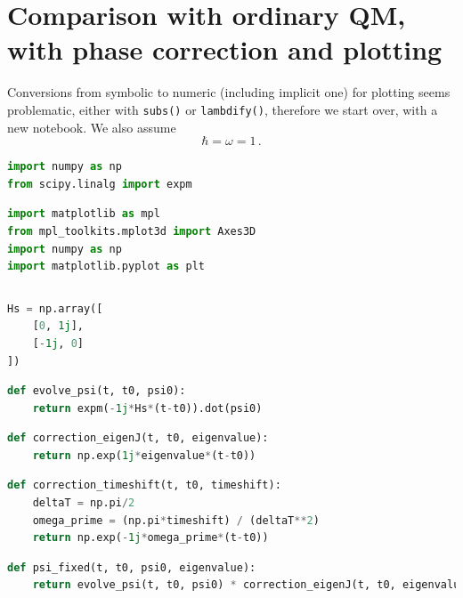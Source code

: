 \hypertarget{nb:moreva-vs-qm}{%
\section{Comparison with ordinary
QM, with phase correction and plotting}\label{nb:moreva-vs-qm}}

Conversions from symbolic to numeric (including implicit one) for
plotting seems problematic, either with \verb#subs()#
or \verb#lambdify()#, therefore we start over, with a
new notebook. We also assume \begin{equation*}
    \hbar = \omega = 1 \,\text{.}
\end{equation*}

\begin{lstlisting}[language=Python]
import numpy as np
from scipy.linalg import expm
\end{lstlisting}

\begin{lstlisting}[language=Python]
import matplotlib as mpl
from mpl_toolkits.mplot3d import Axes3D
import numpy as np
import matplotlib.pyplot as plt
\end{lstlisting}

\begin{lstlisting}[language=Python]
%matplotlib inline
\end{lstlisting}

\begin{lstlisting}[language=Python]
Hs = np.array([
    [0, 1j],
    [-1j, 0]
])
\end{lstlisting}

\begin{lstlisting}[language=Python]
def evolve_psi(t, t0, psi0):
    return expm(-1j*Hs*(t-t0)).dot(psi0)
\end{lstlisting}

\begin{lstlisting}[language=Python]
def correction_eigenJ(t, t0, eigenvalue):
    return np.exp(1j*eigenvalue*(t-t0))
\end{lstlisting}

\begin{lstlisting}[language=Python]
def correction_timeshift(t, t0, timeshift):
    deltaT = np.pi/2
    omega_prime = (np.pi*timeshift) / (deltaT**2)
    return np.exp(-1j*omega_prime*(t-t0))
\end{lstlisting}

\begin{lstlisting}[language=Python]
def psi_fixed(t, t0, psi0, eigenvalue):
    return evolve_psi(t, t0, psi0) * correction_eigenJ(t, t0, eigenvalue) * correction_timeshift(t, t0, t0)
\end{lstlisting}

